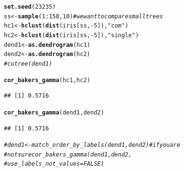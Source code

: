 \documentclass[shortnames,nojss,article]{jss}\usepackage[]{graphicx}\usepackage[]{color}
\makeatletter
\newcommand{\hlnum}[1]{\textcolor[rgb]{0.686,0.059,0.569}{#1}}%
\newcommand{\hlstr}[1]{\textcolor[rgb]{0.192,0.494,0.8}{#1}}%
\newcommand{\hlcom}[1]{\textcolor[rgb]{0.678,0.584,0.686}{\textit{#1}}}%
\newcommand{\hlopt}[1]{\textcolor[rgb]{0,0,0}{#1}}%
\newcommand{\hlstd}[1]{\textcolor[rgb]{0.345,0.345,0.345}{#1}}%
\newcommand{\hlkwb}[1]{\textcolor[rgb]{0.69,0.353,0.396}{#1}}%
\newcommand{\hlkwd}[1]{\textcolor[rgb]{0.737,0.353,0.396}{\textbf{#1}}}%
\newenvironment{kframe}{%
 \def\at@end@of@kframe{}%
 \ifinner\ifhmode%
  \def\at@end@of@kframe{\end{minipage}}%
  \begin{minipage}{\columnwidth}%
 \fi\fi%
 \def\FrameCommand##1{\hskip\@totalleftmargin \hskip-\fboxsep
 \colorbox{shadecolor}{##1}\hskip-\fboxsep
     \hskip-\linewidth \hskip-\@totalleftmargin \hskip\columnwidth}%
 \MakeFramed {\advance\hsize-\width
   \@totalleftmargin\z@ \linewidth\hsize
   \@setminipage}}%
 {\par\unskip\endMakeFramed%
 \at@end@of@kframe}
\newenvironment{knitrout}{}{} %
\makeatother
\begin{document}
\begin{knitrout}
\color{fgcolor}\begin{kframe}
\begin{alltt}
\hlkwd{set.seed}\hlstd{(}\hlnum{23235}\hlstd{)}
\hlstd{ss} \hlkwb{<-} \hlkwd{sample}\hlstd{(}\hlnum{1}\hlopt{:}\hlnum{150}\hlstd{,} \hlnum{10}\hlstd{)}  \hlcom{# we want to compare small trees}
\hlstd{hc1} \hlkwb{<-} \hlkwd{hclust}\hlstd{(}\hlkwd{dist}\hlstd{(iris[ss,} \hlopt{-}\hlnum{5}\hlstd{]),} \hlstr{"com"}\hlstd{)}
\hlstd{hc2} \hlkwb{<-} \hlkwd{hclust}\hlstd{(}\hlkwd{dist}\hlstd{(iris[ss,} \hlopt{-}\hlnum{5}\hlstd{]),} \hlstr{"single"}\hlstd{)}
\hlstd{dend1} \hlkwb{<-} \hlkwd{as.dendrogram}\hlstd{(hc1)}
\hlstd{dend2} \hlkwb{<-} \hlkwd{as.dendrogram}\hlstd{(hc2)}
\hlcom{# cutree(dend1)}

\hlkwd{cor_bakers_gamma}\hlstd{(hc1, hc2)}
\end{alltt}
\begin{verbatim}
## [1] 0.5716
\end{verbatim}
\begin{alltt}
\hlkwd{cor_bakers_gamma}\hlstd{(dend1, dend2)}
\end{alltt}
\begin{verbatim}
## [1] 0.5716
\end{verbatim}
\begin{alltt}
\hlcom{# dend1 <- match_order_by_labels(dend1, dend2) # if you are}
\hlcom{# not sure cor_bakers_gamma(dend1, dend2,}
\hlcom{# use_labels_not_values = FALSE)}


\end{alltt}
\end{kframe}
\end{knitrout}
\end{document}
